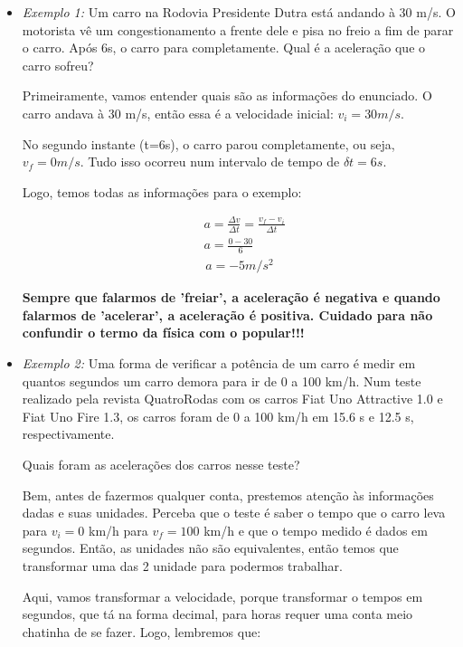 \documentclass[12pt]{extarticle}
\newcommand{\<}{\langle}
\renewcommand{\>}{\rangle}
\theoremstyle{definition}
\begin{document}
\begin{itemize}
    \item \textit{Exemplo 1:} Um carro na Rodovia Presidente Dutra está andando à 30 m/s. O motorista vê um congestionamento a frente dele e pisa no freio a fim de parar o carro. Após 6s, o carro para completamente. Qual é a aceleração que o carro sofreu?
    
    Primeiramente, vamos entender quais são as informações do enunciado. O carro andava à 30 m/s, então essa é a velocidade inicial: $v_i = 30 m/s$.
    
    No segundo instante (t=6s), o carro parou completamente, ou seja, $v_f =0 m/s$. Tudo isso ocorreu num intervalo de tempo de $\delta t = 6s$.
    
    Logo, temos todas as informações para o exemplo:
    
    \begin{align*}
        &a = \frac{\Delta v}{\Delta t} = \frac{v_f - v_i}{\Delta t} \\ &a = \frac{0 - 30}{6}
    \end{align*}
    \begin{align}
        \boxed{ a = - 5 m/s^2}
    \end{align}
    
    \textbf{Sempre que falarmos de 'freiar', a aceleração é negativa e quando falarmos de 'acelerar', a aceleração é positiva. Cuidado para não confundir o termo da física com o popular!!!}
    
    \item \textit{Exemplo 2:} Uma forma de verificar a potência de um carro é medir em quantos segundos um carro demora para ir de 0 a 100 km/h. Num teste realizado pela revista QuatroRodas com os carros Fiat Uno Attractive 1.0 e Fiat Uno Fire 1.3, os carros foram de 0 a 100 km/h em 15.6 s e 12.5 s, respectivamente.
    
    Quais foram as acelerações dos carros nesse teste?
    
    Bem, antes de fazermos qualquer conta, prestemos atenção às informações dadas e suas unidades. Perceba que o teste é saber o  tempo que o carro leva para $v_i = 0$ km/h para $v_f = 100$ km/h e que o tempo medido é dados em segundos. Então, as unidades não são equivalentes, então temos que transformar uma das 2 unidade para podermos trabalhar.
    
    Aqui, vamos transformar a velocidade, porque transformar o tempos em segundos, que tá na forma decimal, para horas requer uma conta meio chatinha de se fazer. Logo, lembremos que:
    

\end{itemize}
\end{document}
